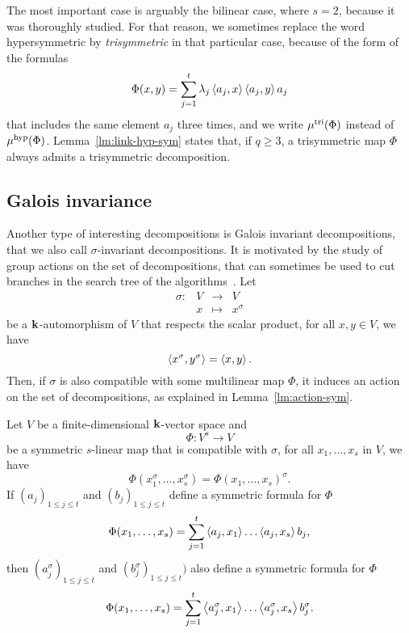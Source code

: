 The most important case is arguably the bilinear case, where $s=2$, because it
was thoroughly studied. For that reason, we sometimes replace the word
hypersymmetric by \emph{trisymmetric} in that particular case, because of the
form of the formulas
\[
  \Phi(x, y) = \sum_{j=1}^t\lambda_j\left\langle a_j,x\right\rangle\left\langle a_j,y\right\rangle a_j
\]
that includes the same element $a_j$ three times, and we write $\mu^{\textrm{tri}}(\Phi)$
instead of $\mu^{\textrm{hyp}}(\Phi)$. Lemma~\ref{lm:link-hyp-sym} states that, if $q\geq3$, a
trisymmetric map $\Phi$ always admits a trisymmetric decomposition.

\subsection{Galois invariance}

Another type of interesting decompositions is Galois invariant decompositions,
that we also call $\sigma$-invariant decompositions.
It is motivated by the study of group actions on the set of decompositions, that
can sometimes be used to cut branches in the search tree of the
algorithms~\cite{Covanov19}.
%
Let 
\[
 \begin{array}{cccc}
   \sigma: & V &\to&V\\
 &x&\mapsto&x^\sigma
 \end{array}
\]
be a $\mathbf{k}$-automorphism of $V$ that respects the scalar product, \ie for all $x,
y\in V$, we have
\[
  \left\langle x^\sigma,y^\sigma\right\rangle = \left\langle x,y\right\rangle.
\]
Then, if $\sigma$ is also compatible with some multilinear map $\Phi$, it induces
an action on the set of decompositions, as explained in
Lemma~\ref{lm:action-sym}.
\begin{lm}
  \label{lm:action-sym}
  Let $V$ be a finite-dimensional $\mathbf{k}$-vector space and
  \[
    \Phi:V^s\to V
  \]
  be a symmetric $s$-linear map that is compatible with $\sigma$, \ie for all
  $x_1, \dots, x_s$ in $V$, we have
  \[
    \Phi(x_1^\sigma, \dots, x_s^\sigma) = \Phi(x_1, \dots, x_s)^\sigma.
  \]
  If $(a_j)_{1\leq j \leq t}$ and $(b_j)_{1\leq j \leq t}$ define a symmetric
  formula for $\Phi$
  \[
    \Phi(x_1, \dots, x_s) = \sum_{j=1}^t\left\langle a_j,x_1\right\rangle\dots\left\langle a_j,x_s\right\rangle b_j,
  \]
  then $(a_j^\sigma)_{1\leq j\leq t}$ and $(b_{j}^\sigma)_{1\leq j\leq t})$ also
  define a symmetric formula for $\Phi$
  \[
    \Phi(x_1, \dots, x_s) =
    \sum_{j=1}^t\left\langle a_j^\sigma,x_1\right\rangle\dots\left\langle a_j^\sigma,x_s\right\rangle b_j^\sigma.
  \]
\end{lm}
